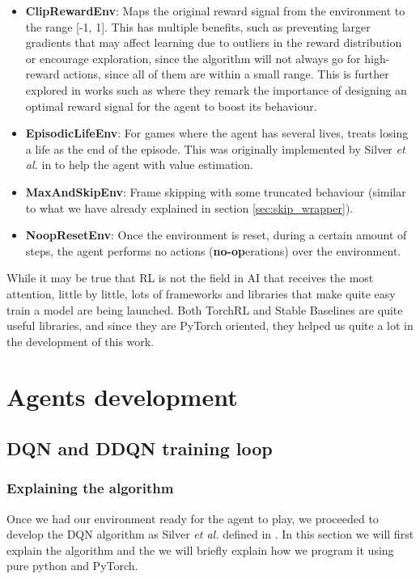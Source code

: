 \begin{itemize}
	\item \textbf{ClipRewardEnv}: Maps the original reward signal from the environment to the range [-1, 1]. This has multiple benefits, such as preventing larger gradients that may affect learning due to outliers in the reward distribution or encourage exploration, since the algorithm will not always go for high-reward actions, since all of them are within a small range. This is further explored in works such as \cite{Eschmann2021} where they remark the importance of designing an optimal reward signal for the agent to boost its behaviour.
	\item \textbf{EpisodicLifeEnv}: For games where the agent has several lives, treats losing a life as the end of the episode. This was originally implemented by Silver \textit{et al.} in \cite{mnih2013playing} to help the agent with value estimation.
	\item \textbf{MaxAndSkipEnv}: Frame skipping with some truncated behaviour (similar to what we have already explained in section \ref{sec:skip_wrapper}).
	\item \textbf{NoopResetEnv}: Once the environment is reset, during a certain amount of steps, the agent performs no actions (\textbf{no-op}erations) over the environment.
\end{itemize}

 While it may be true that RL is not the field in AI that receives the most attention, little by little, lots of frameworks and libraries that make quite easy train a model are being launched. Both TorchRL and Stable Baselines are quite useful libraries, and since they are PyTorch oriented, they helped us quite a lot in the development of this work.

\section{Agents development}
\label{sec:agents_dev}

\subsection{DQN  and DDQN training loop}
\label{sec:dqn_training_loop}
\subsubsection{Explaining the algorithm}
Once we had our environment ready for the agent to play, we proceeded to develop the DQN algorithm as Silver \textit{et al.} defined in \cite{mnih2013playing}. In this section we will first explain the algorithm and the we will briefly explain how we program it using pure python and PyTorch.

